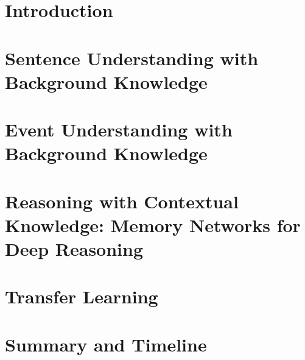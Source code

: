 \documentclass[12pt]{cmuthesis}
\begin{document}
% 



\tableofcontents
\listoffigures
\listoftables

\mainmatter


%
%
%
%
%


\chapter{Introduction}
\label{chapter:introduction}

\chapter{Sentence Understanding with Background Knowledge}
\label{chapter:ontolstm}

\chapter{Event Understanding with Background Knowledge}
\label{chapter:nem}

\chapter{Reasoning with Contextual Knowledge: Memory Networks for Deep Reasoning}
\label{chapter:memnet_qa}

\chapter{Transfer Learning}
\label{chapter:transfer_learning}

\chapter{Summary and Timeline}

\end{document}
